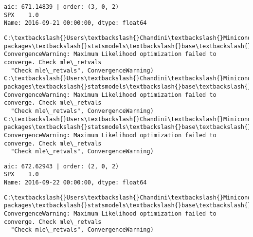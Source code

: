 \documentclass[11pt]{article}
\begin{document}
    \begin{Verbatim}[commandchars=\\\{\}]
aic: 671.14839 | order: (3, 0, 2)
SPX    1.0
Name: 2016-09-21 00:00:00, dtype: float64

    \end{Verbatim}

    \begin{Verbatim}[commandchars=\\\{\}]
C:\textbackslash{}Users\textbackslash{}Chandini\textbackslash{}Miniconda3\textbackslash{}envs\textbackslash{}auquan\textbackslash{}lib\textbackslash{}site-packages\textbackslash{}statsmodels\textbackslash{}base\textbackslash{}model.py:496: ConvergenceWarning: Maximum Likelihood optimization failed to converge. Check mle\_retvals
  "Check mle\_retvals", ConvergenceWarning)
C:\textbackslash{}Users\textbackslash{}Chandini\textbackslash{}Miniconda3\textbackslash{}envs\textbackslash{}auquan\textbackslash{}lib\textbackslash{}site-packages\textbackslash{}statsmodels\textbackslash{}base\textbackslash{}model.py:496: ConvergenceWarning: Maximum Likelihood optimization failed to converge. Check mle\_retvals
  "Check mle\_retvals", ConvergenceWarning)
C:\textbackslash{}Users\textbackslash{}Chandini\textbackslash{}Miniconda3\textbackslash{}envs\textbackslash{}auquan\textbackslash{}lib\textbackslash{}site-packages\textbackslash{}statsmodels\textbackslash{}base\textbackslash{}model.py:496: ConvergenceWarning: Maximum Likelihood optimization failed to converge. Check mle\_retvals
  "Check mle\_retvals", ConvergenceWarning)

    \end{Verbatim}

    \begin{Verbatim}[commandchars=\\\{\}]
aic: 672.62943 | order: (2, 0, 2)
SPX    1.0
Name: 2016-09-22 00:00:00, dtype: float64

    \end{Verbatim}

    \begin{Verbatim}[commandchars=\\\{\}]
C:\textbackslash{}Users\textbackslash{}Chandini\textbackslash{}Miniconda3\textbackslash{}envs\textbackslash{}auquan\textbackslash{}lib\textbackslash{}site-packages\textbackslash{}statsmodels\textbackslash{}base\textbackslash{}model.py:496: ConvergenceWarning: Maximum Likelihood optimization failed to converge. Check mle\_retvals
  "Check mle\_retvals", ConvergenceWarning)

    \end{Verbatim}
\end{document}
